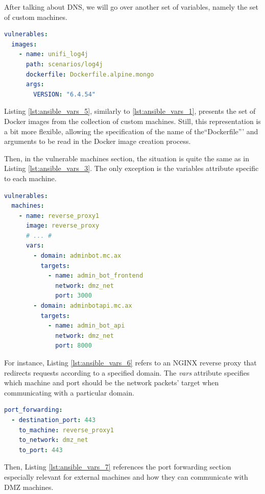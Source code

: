 After talking about DNS, we will go over another set of variables, namely the set of custom machines.

\begin{lstlisting}[language=yaml,caption=Ansible Variables - Custom Images.,numbers=none,label={lst:ansible_vars_5}]
vulnerables:
  images:
    - name: unifi_log4j
      path: scenarios/log4j
      dockerfile: Dockerfile.alpine.mongo
      args:
        VERSION: "6.4.54"
\end{lstlisting}

Listing \ref{lst:ansible_vars_5}, similarly to \ref{lst:ansible_vars_1}, presents the set of Docker images from the collection of custom machines. Still, this representation is a bit more flexible, allowing the specification of the name of the``Dockerfile''' and arguments to be read in the Docker image creation process.

Then, in the vulnerable machines section, the situation is quite the same as in Listing \ref{lst:ansible_vars_3}. The only exception is the variables attribute specific to each machine.

\begin{lstlisting}[language=yaml,caption=Ansible Variables - Custom Machines.,numbers=none,label={lst:ansible_vars_6}]
vulnerables:
  machines:
    - name: reverse_proxy1
      image: reverse_proxy
      # ... #
      vars:
        - domain: adminbot.mc.ax
          targets: 
            - name: admin_bot_frontend
              network: dmz_net
              port: 3000
        - domain: adminbotapi.mc.ax
          targets: 
            - name: admin_bot_api
              network: dmz_net
              port: 8000
\end{lstlisting}

For instance, Listing \ref{lst:ansible_vars_6} refers to an NGINX reverse proxy that redirects requests according to a specified domain. The \textit{vars} attribute specifies which machine and port should be the network packets' target when communicating with a particular domain.

\begin{lstlisting}[language=yaml,caption=Ansible Variables - Port Forwarding.,numbers=none,label={lst:ansible_vars_7}]
port_forwarding:
  - destination_port: 443
    to_machine: reverse_proxy1
    to_network: dmz_net
    to_port: 443
\end{lstlisting}

Then, Listing \ref{lst:ansible_vars_7} references the port forwarding section especially relevant for external machines and how they can communicate with DMZ machines. 


